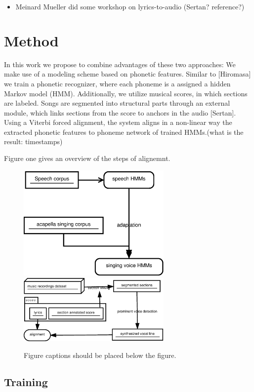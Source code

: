 \documentclass{article}
\begin{document}
\begin{itemize}
\item Meinard Mueller did some workshop on lyrics-to-audio (Sertan? reference?) 
\end{itemize}

\section{Method}
In this work we propose to combine advantages of these two approaches: We make use of a modeling scheme based on phonetic features.  Similar to [Hiromasa] we train a phonetic recognizer, where each phoneme is a assigned a hidden Markov model (HMM). 
Additionally, we utilize musical scores, in which sections are labeled. Songs are segmented into structural parts through an external module, which links sections from the score to anchors in the audio [Sertan].  
Using a Viterbi forced alignment, the system aligns in a non-linear way the extracted phonetic features to phoneme network of trained HMMs.(what is the result: timestamps)
 
Figure one gives an overview of the steps of alignemnt.


\begin{figure}
 \centerline{\includegraphics[width=7.49cm]{Training.eps}\hskip1.5cm\includegraphics[width=7.49cm]{Alignment.eps}}
 \caption{Figure captions should be placed below the figure.}
 \label{fig:example}
\end{figure}


\subsection{Training}
\end{document}
